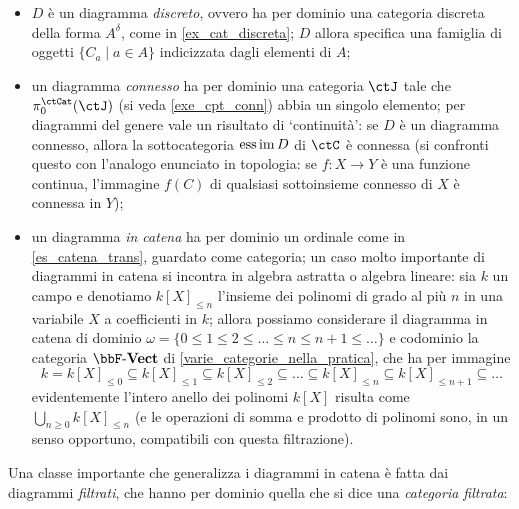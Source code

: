 \begin{itemize}
	\item \(D\) è un diagramma \emph{discreto}, ovvero ha per dominio una categoria discreta della forma \(A^\delta\), come in \ref{ex_cat_discreta}; \(D\) allora specifica una famiglia di oggetti \(\{C_a\mid a\in A\}\) indicizzata dagli elementi di \(A\);
	\item un diagramma \emph{connesso} ha per dominio una categoria \(\ctJ\) tale che \(\pi_0^\ctCat(\ctJ)\) (si veda \ref{exe_cpt_conn}) abbia un singolo elemento; per diagrammi del genere vale un risultato di `continuità': se \(D\) è un diagramma connesso, allora la sottocategoria \(\operatorname*{ess\,im} D\) di \(\ctC\) è connessa (si confronti questo con l'analogo enunciato in topologia: se \(f : X\to Y\) è una funzione continua, l'immagine \(f(C)\) di qualsiasi sottoinsieme connesso di \(X\) è	connessa in \(Y\));
	\item un diagramma \emph{in catena} ha per dominio un ordinale come in \ref{es_catena_trans}, guardato come categoria; un caso molto importante di diagrammi in catena si incontra in algebra astratta o algebra lineare: sia \(k\) un campo e denotiamo \(k[X]_{\le n}\)	l'insieme dei polinomi di grado al più \(n\) in una variabile \(X\) a coefficienti in \(k\); allora possiamo considerare il diagramma in catena di dominio \(\omega=\{0\le1\le 2\le\dots\le n\le n+1\le\dots\}\) e codominio la categoria \(\ctVect\) di \ref{varie_categorie_nella_pratica}, che ha per immagine
	      \[
		      k = k[X]_{\le 0} \subseteq
		      k[X]_{\le 1} \subseteq
		      k[X]_{\le 2} \subseteq \dots
		      \subseteq k[X]_{\le n} \subseteq k[X]_{\le n+1} \subseteq \dots
	      \]
	      evidentemente l'intero anello dei polinomi \(k[X]\) risulta come \(\bigcup_{n\ge 0} k[X]_{\le n}\) (e le operazioni di somma e prodotto di polinomi sono, in un senso opportuno, compatibili con questa filtrazione).
\end{itemize}
Una classe importante che generalizza i diagrammi in catena è fatta dai diagrammi \emph{filtrati}, che hanno per dominio quella che si dice una \emph{categoria filtrata}:
